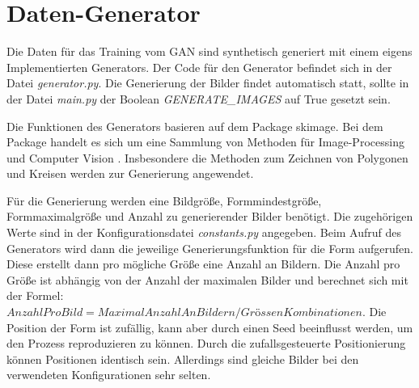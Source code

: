 \section{Daten-Generator}
Die Daten für das Training vom GAN sind synthetisch generiert mit einem eigens Implementierten Generators.
Der Code für den Generator befindet sich in der Datei \textit{generator.py}.
Die Generierung der Bilder findet automatisch statt, sollte in der Datei \textit{main.py} der Boolean \textit{GENERATE\_IMAGES} auf True gesetzt sein.
\newline

Die Funktionen des Generators basieren auf dem Package skimage.
Bei dem Package handelt es sich um eine Sammlung von Methoden für Image-Processing und Computer Vision .
Insbesondere die Methoden zum Zeichnen von Polygonen und Kreisen werden zur Generierung angewendet.
\newline

Für die Generierung werden eine Bildgröße, Formmindestgröße, Formmaximalgröße und Anzahl zu generierender Bilder benötigt.
Die zugehörigen Werte sind in der Konfigurationsdatei \textit{constants.py} angegeben.
Beim Aufruf des Generators wird dann die jeweilige Generierungsfunktion für die Form aufgerufen.
Diese erstellt dann pro mögliche Größe eine Anzahl an Bildern.
Die Anzahl pro Größe ist abhängig von der Anzahl der maximalen Bilder und berechnet sich mit der Formel: $AnzahlProBild = MaximalAnzahlAnBildern / GrössenKombinationen$.
Die Position der Form ist zufällig, kann aber durch einen Seed beeinflusst werden, um den Prozess reproduzieren zu können.
Durch die zufallsgesteuerte Positionierung können Positionen identisch sein.
Allerdings sind gleiche Bilder bei den verwendeten Konfigurationen sehr selten. 

